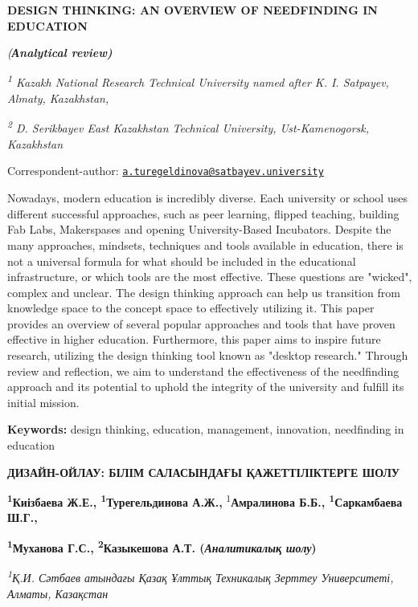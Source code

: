 
{\bfseries DESIGN THINKING: AN OVERVIEW OF NEEDFINDING IN EDUCATION}

\emph{({\bfseries Аnalytical review)}}

\emph{\textsuperscript{1} Kazakh National Research Technical University
named after K. I. Satpayev, Almaty, Kazakhstan,}

\emph{\textsuperscript{2} D. Serikbayev East Kazakhstan Technical
University, Ust-Kamenogorsk, Kazakhstan}

{\bfseries \textsuperscript{\envelope }}Correspondent-author:
\href{mailto:a.turegeldinova@satbayev.university}{\nolinkurl{a.turegeldinova@satbayev.university}}

Nowadays, modern education is incredibly diverse. Each university or
school uses different successful approaches, such as peer learning,
flipped teaching, building Fab Labs, Makerspases and opening
University-Based Incubators. Despite the many approaches, mindsets,
techniques and tools available in education, there is not a universal
formula for what should be included in the educational infrastructure,
or which tools are the most effective. These questions are "wicked",
complex and unclear. The design thinking approach can help us transition
from knowledge space to the concept space to effectively utilizing it.
This paper provides an overview of several popular approaches and tools
that have proven effective in higher education. Furthermore, this paper
aims to inspire future research, utilizing the design thinking tool
known as "desktop research." Through review and reflection, we aim to
understand the effectiveness of the needfinding approach and its
potential to uphold the integrity of the university and fulfill its
initial mission.

{\bfseries Keywords:} design thinking, education, management, innovation,
needfinding in education

{\bfseries ДИЗАЙН-ОЙЛАУ: БІЛІМ САЛАСЫНДАҒЫ ҚАЖЕТТІЛІКТЕРГЕ ШОЛУ}

{\bfseries \textsuperscript{1}Киізбаева Ж.Е.,
\textsuperscript{1}Турегельдинова А.Ж.\textsuperscript{\envelope },}
\textsuperscript{1}{\bfseries Амралинова Б.Б.,
\textsuperscript{1}Саркамбаева Ш.Г.,}

{\bfseries \textsuperscript{1}Муханова Г.С., \textsuperscript{2}Казыкешова
А.Т. (\emph{Аналитикалық шолу})}

\emph{\textsuperscript{1}Қ.И. Сәтбаев атындағы Қазақ Ұлттық Техникалық
Зерттеу Университеті, Алматы, Казақстан}

